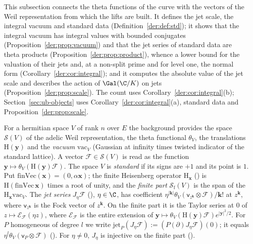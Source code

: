 This subsection connects the theta functions of the curve with the vectors of the Weil
representation from which the lifts are built. It defines the jet scale, the integral vacuum and
standard data (Definition~\ref{der:def:std}); it shows that the integral vacuum has integral values
with bounded conjugates (Proposition~\ref{der:prop:vacuum}) and that the jet series of standard data
are theta products (Proposition~\ref{der:prop:product}), whence a lower bound for the valuation of
their jets and, at a non-split prime and for level one, the normal form
(Corollary~\ref{der:cor:integral}); and it
computes the absolute value of the jet scale and describes the action of $\Gal(\C/K)$ on jets
(Proposition~\ref{der:prop:scale}). The count uses Corollary~\ref{der:cor:integral}(b);
Section~\ref{sec:ub-objects} uses Corollary~\ref{der:cor:integral}(a), standard data and
Proposition~\ref{der:prop:scale}.

For a hermitian space $V$ of rank $n$ over $E$ the background provides the space $\mathscr S(V)$
of the adelic Weil representation, the theta functional $\theta_V$, the translations
$\mathrm H(\mathbf y)$ and the \emph{vacuum} $\mathrm{vac}_V$ (Gaussian at infinity times twisted
indicator of the standard lattice). A vector $\mathcal F\in\mathscr S(V)$ is read as the function
$\mathbf y\mapsto\theta_V(\mathrm H(\mathbf y)\mathcal F)$. The space $V$ is \emph{standard} if its
signs are $+1$ and its point is $1$. Put $\mathrm{finVec}(\mathbf x)=(0,\alpha\mathbf x)$; the finite
Heisenberg operator $\mathrm H_{\mathbf x}$ () is
$\mathrm H(\mathrm{finVec}\,\mathbf x)$ times a root of unity, and the \emph{finite part}
$\mathscr S_{\mathrm f}(V)$ is the span of the $\mathrm H_{\mathbf x}\mathrm{vac}_V$. The \emph{jet
series} $J_\eta\mathcal F$ (), $\eta\in\C$, has coefficient
$\eta^{|\mathbf k|}\theta_V(\mathsf v_{z^{\mathbf k}}\otimes\mathcal F)/\mathbf k!$ at $z^{\mathbf k}$,
where $\mathsf v_{z^{\mathbf k}}$ is the Fock vector of $z^{\mathbf k}$. On the finite part it is the
Taylor series at $0$ of $z\mapsto\mathcal E_{\mathcal F}(\eta z)$, where $\mathcal E_{\mathcal F}$ is
the entire extension of $\mathbf y\mapsto\theta_V(\mathrm H(\mathbf y)\mathcal F)e^{|\mathbf y|^2/2}$.
For $P$ homogeneous of degree $l$ we write $\mathrm{jet}_P(J_\eta\mathcal F):=(P(\partial)J_\eta\mathcal F)(0)$;
it equals $\eta^l\theta_V(\mathsf v_P\otimes\mathcal F)$ ().
For $\eta\ne0$, $J_\eta$ is injective on the finite part ().

